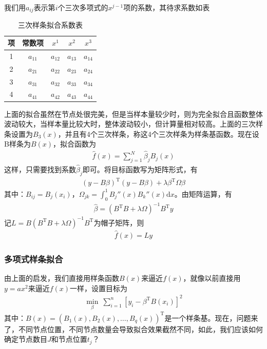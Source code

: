            我们用$a_{ij}$表示第$i$个三次多项式的$x^{j-1}$项的系数，其待求系数如表
            \begin{table}[htbp]
              \caption{三次样条拟合系数表}
              \label{tab:三次样条拟合系数表}
              \centering
              \begin{tabular}{c|cccc}
              \toprule
              项     & 常数项 & $x^1$  & $x^2$  & $x^3$ \\
              \midrule
              1      & $a_{11}$      & $a_{12}$      & $a_{13}$     &$a_{14}$ \\
              2      & $a_{21}$      & $a_{22}$      & $a_{23}$     &$a_{24}$ \\
              3      & $a_{31}$      & $a_{32}$      & $a_{33}$     &$a_{34}$ \\
              4      & $a_{41}$      & $a_{42}$      & $a_{43}$     &$a_{44}$ \\
              \bottomrule
              \end{tabular}
            \end{table}
            \par
            上面的拟合虽然在节点处很完美，但是当样本量较少时，则为完全拟合且函数整体波动较大，当样本量比较大时，整体波动较小，但计算量相对较高。上面的三次样条设置为$B_3(x)$，并且有4个三次样条，称这4个三次样条为样条基函数。现在设B样条为$B(x)$，拟合函数为
            \begin{align*}
            \hat{f}(x) = \sum_{j=1}^N\hat{\beta}_jB_j(x)
            \end{align*}
            这样，只需要找到系数$\hat{\beta}_j$即可。将目标函数写为矩阵形式，有
            \begin{align*}
            (y-B\beta)^\mathrm{T}(y-B\beta) + \lambda \beta^\mathrm{T}\Omega\beta
            \end{align*}
            其中：$B_{ij} = B_j(x_i)$，$\Omega_{jk} = \int_0^1 B_j''(x)B_k''(x)\mathrm{d}x$。由矩阵运算，有
            \begin{align*}
            \hat{\beta} = (B^\mathrm{T}B+\lambda \Omega)^{-1}B^\mathrm{T}y
            \end{align*}
            记$L = B(B^\mathrm{T}B+\lambda \Omega)^{-1}B^\mathrm{T}$为帽子矩阵，则
            \begin{align*}
            \hat{f}(x) = Ly
            \end{align*}

        \subsubsection{多项式样条拟合}
            \par
            由上面的启发，我们直接用样条函数$B(x)$来逼近$f(x)$，就像以前直接用$y = ax^2$来逼近$f(x)$一样，设置目标为
            \begin{align*}
            \min_\beta\ \sum_{i=1}^n[y_i - \beta^\mathrm{T}B(x_i)]^2
            \end{align*}
            其中：$B(x) = (B_1(x),B_2(x),\dots,B_q(x))^\mathrm{T}$是一个样条基。现在，问题来了，不同节点位置，不同节点数量会导致拟合效果截然不同，如此，我们应该如何确定节点数目$J$和节点位置$t_j$？
